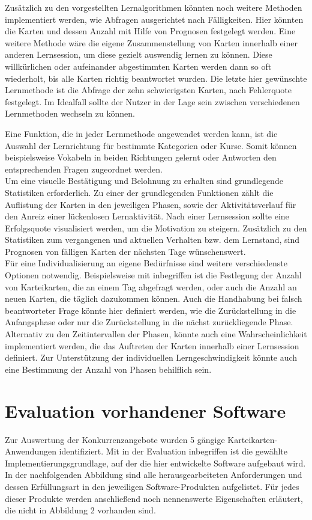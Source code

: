 Zusätzlich zu den vorgestellten Lernalgorithmen könnten noch weitere Methoden implementiert werden, wie Abfragen ausgerichtet nach Fälligkeiten. Hier könnten die Karten und dessen Anzahl mit Hilfe von Prognosen festgelegt werden. Eine weitere Methode wäre die eigene Zusammenstellung von Karten innerhalb einer anderen Lernsession, um diese gezielt auswendig lernen zu können. Diese willkürlichen oder aufeinander abgestimmten Karten werden dann so oft wiederholt, bis alle Karten richtig beantwortet wurden. Die letzte hier gewünschte Lernmethode ist die Abfrage der zehn schwierigsten Karten, nach Fehlerquote festgelegt. Im Idealfall sollte der Nutzer in der Lage sein zwischen verschiedenen Lernmethoden wechseln zu können. 

Eine Funktion, die in jeder Lernmethode angewendet werden kann, ist die Auswahl der Lernrichtung für bestimmte Kategorien oder Kurse. Somit können beispielsweise Vokabeln in beiden Richtungen gelernt oder Antworten den entsprechenden Fragen zugeordnet werden. \\

Um eine visuelle Bestätigung und Belohnung zu erhalten sind grundlegende Statistiken erforderlich. Zu einer der grundlegenden Funktionen zählt die Auflistung der Karten in den jeweiligen Phasen, sowie der Aktivitätsverlauf für den Anreiz einer lückenlosen Lernaktivität. Nach einer Lernsession sollte eine Erfolgsquote visualisiert werden, um die Motivation zu steigern. Zusätzlich zu den Statistiken zum vergangenen und aktuellen Verhalten bzw. dem Lernstand, sind Prognosen von fälligen Karten der nächsten Tage wünschenswert. \\

Für eine Individualisierung an eigene Bedürfnisse sind weitere verschiedenste Optionen notwendig. Beispielsweise mit inbegriffen ist die Festlegung der Anzahl von Karteikarten, die an einem Tag abgefragt werden, oder auch die Anzahl an neuen Karten, die täglich dazukommen können. Auch die Handhabung bei falsch beantworteter Frage könnte hier definiert werden, wie die Zurückstellung in die Anfangsphase oder nur die Zurückstellung in die nächst zurückliegende Phase. Alternativ zu den Zeitintervallen der Phasen, könnte auch eine Wahrscheinlichkeit implementiert werden, die das Auftreten der Karten innerhalb einer Lernsession definiert. Zur Unterstützung der individuellen Lerngeschwindigkeit könnte auch eine Bestimmung der Anzahl von Phasen behilflich sein. 



\section{Evaluation vorhandener Software}
Zur Auswertung der Konkurrenzangebote wurden 5 gängige Karteikarten-Anwendungen identifiziert. Mit in der Evaluation inbegriffen ist die gewählte Implementierungsgrundlage, auf der die hier entwickelte Software aufgebaut wird. In der nachfolgenden Abbildung sind alle herausgearbeiteten Anforderungen und dessen Erfüllungsart in den jeweiligen Software-Produkten aufgelistet. Für jedes dieser Produkte werden anschließend noch nennenswerte Eigenschaften erläutert, die nicht in Abbildung 2 vorhanden sind.

